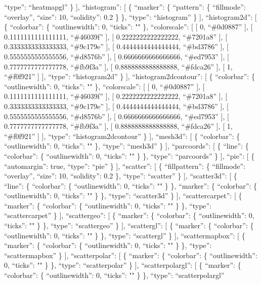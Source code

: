 \documentclass[
]{article}
\begin{document}
``type'': ``heatmapgl'' \} {]}, ``histogram'': {[} \{ ``marker'': \{
``pattern'': \{ ``fillmode'': ``overlay'', ``size'': 10, ``solidity'':
0.2 \} \}, ``type'': ``histogram'' \} {]}, ``histogram2d'': {[} \{
``colorbar'': \{ ``outlinewidth'': 0, ``ticks'': "" \}, ``colorscale'':
{[} {[} 0, ``\#0d0887'' {]}, {[} 0.1111111111111111, ``\#46039f'' {]},
{[} 0.2222222222222222, ``\#7201a8'' {]}, {[} 0.3333333333333333,
``\#9c179e'' {]}, {[} 0.4444444444444444, ``\#bd3786'' {]}, {[}
0.5555555555555556, ``\#d8576b'' {]}, {[} 0.6666666666666666,
``\#ed7953'' {]}, {[} 0.7777777777777778, ``\#fb9f3a'' {]}, {[}
0.8888888888888888, ``\#fdca26'' {]}, {[} 1, ``\#f0f921'' {]} {]},
``type'': ``histogram2d'' \} {]}, ``histogram2dcontour'': {[} \{
``colorbar'': \{ ``outlinewidth'': 0, ``ticks'': "" \}, ``colorscale'':
{[} {[} 0, ``\#0d0887'' {]}, {[} 0.1111111111111111, ``\#46039f'' {]},
{[} 0.2222222222222222, ``\#7201a8'' {]}, {[} 0.3333333333333333,
``\#9c179e'' {]}, {[} 0.4444444444444444, ``\#bd3786'' {]}, {[}
0.5555555555555556, ``\#d8576b'' {]}, {[} 0.6666666666666666,
``\#ed7953'' {]}, {[} 0.7777777777777778, ``\#fb9f3a'' {]}, {[}
0.8888888888888888, ``\#fdca26'' {]}, {[} 1, ``\#f0f921'' {]} {]},
``type'': ``histogram2dcontour'' \} {]}, ``mesh3d'': {[} \{
``colorbar'': \{ ``outlinewidth'': 0, ``ticks'': "" \}, ``type'':
``mesh3d'' \} {]}, ``parcoords'': {[} \{ ``line'': \{ ``colorbar'': \{
``outlinewidth'': 0, ``ticks'': "" \} \}, ``type'': ``parcoords'' \}
{]}, ``pie'': {[} \{ ``automargin'': true, ``type'': ``pie'' \} {]},
``scatter'': {[} \{ ``fillpattern'': \{ ``fillmode'': ``overlay'',
``size'': 10, ``solidity'': 0.2 \}, ``type'': ``scatter'' \} {]},
``scatter3d'': {[} \{ ``line'': \{ ``colorbar'': \{ ``outlinewidth'': 0,
``ticks'': "" \} \}, ``marker'': \{ ``colorbar'': \{ ``outlinewidth'':
0, ``ticks'': "" \} \}, ``type'': ``scatter3d'' \} {]},
``scattercarpet'': {[} \{ ``marker'': \{ ``colorbar'': \{
``outlinewidth'': 0, ``ticks'': "" \} \}, ``type'': ``scattercarpet'' \}
{]}, ``scattergeo'': {[} \{ ``marker'': \{ ``colorbar'': \{
``outlinewidth'': 0, ``ticks'': "" \} \}, ``type'': ``scattergeo'' \}
{]}, ``scattergl'': {[} \{ ``marker'': \{ ``colorbar'': \{
``outlinewidth'': 0, ``ticks'': "" \} \}, ``type'': ``scattergl'' \}
{]}, ``scattermapbox'': {[} \{ ``marker'': \{ ``colorbar'': \{
``outlinewidth'': 0, ``ticks'': "" \} \}, ``type'': ``scattermapbox'' \}
{]}, ``scatterpolar'': {[} \{ ``marker'': \{ ``colorbar'': \{
``outlinewidth'': 0, ``ticks'': "" \} \}, ``type'': ``scatterpolar'' \}
{]}, ``scatterpolargl'': {[} \{ ``marker'': \{ ``colorbar'': \{
``outlinewidth'': 0, ``ticks'': "" \} \}, ``type'': ``scatterpolargl''
\end{document}
